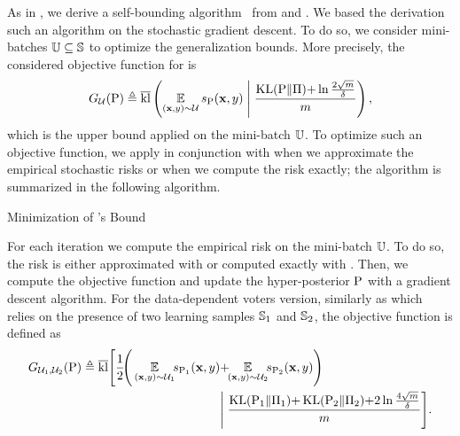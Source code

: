 As in , we derive a self-bounding algorithm~\citep{Freund1998} from  and .
We based the derivation such an algorithm on the stochastic gradient descent. 
To do so, we consider mini-batches $\batch\subseteq\S$ to optimize the generalization bounds.
More precisely, the considered objective function for  is  
\begin{align}
    \StoObjbatch \defeq \klmax\LP \EE_{(\x,\y)\sim\dbatch}s_{\hyperQ}(\x, \y) \;\middle|\; \frac{\KL(\hyperQ\|\hyperP){+}\ln\frac{2\sqrt{m}}{\delta}}{\m}\RP,\label{chap:mv-sto:eq:obj-bound}
\end{align}
which is the upper bound applied on the mini-batch $\batch$.
To optimize such an objective function, we apply  in conjunction with  when we approximate the empirical stochastic risks or  when we compute the risk exactly; the algorithm is summarized in the following algorithm.

\begin{algorithm}[H]
 \caption{Minimization of 's Bound}
 \begin{algorithmic}
 \State{$\hyperQ \leftarrow \hyperP$}
 \EndFor
 \EndFor
 \State{\Return{$\hyperQ$}}
 \end{algorithmic}
 \label{chap:mv-sto:algo:not-data}
\end{algorithm}

For each iteration we compute the empirical risk on the mini-batch $\batch$.
To do so, the risk is either approximated with  or computed exactly with .
Then, we compute the objective function and update the hyper-posterior $\hyperQ$ with a gradient descent algorithm.
For the data-dependent voters version, similarly as  which relies on the presence of two learning samples $\S_1$ and $\S_2$, the objective function is defined as
\begin{align}
\MulStoObjbatch \defeq \klmax\Bigg[ \frac{1}{2}\!\Bigg(\EE_{(\x,\y)\sim\dbatch_1}\!\!s_{\hyperQ_1}(\x, \y)&{+}\!\!\EE_{(\x,\y)\sim\dbatch_2}\!\!s_{\hyperQ_2}(\x, \y)\Bigg)\nonumber\\
&\Bigg|\; \frac{\KL(\hyperQ_1\|\hyperP_1){+}\KL(\hyperQ_2\|\hyperP_2){+}2\ln\tfrac{4\sqrt{\m}}{\delta}}{\m}\Bigg].\label{chap:mv-sto:eq:obj-bound-data}
\end{align}


